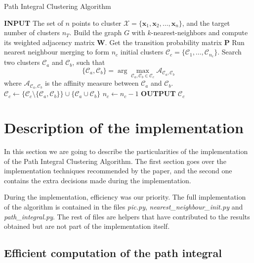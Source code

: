 \documentclass[
	10pt,
	parskip=half-,	
	paper=a4,
	english
	]{scrartcl}
\begin{document}
\begin{algorithm}
\caption{Path Integral Clustering Algorithm}
\begin{algorithmic}[1]
    \State \textbf{INPUT} The set of $n$ points to cluster $\mathcal{X} = \{\mathbf{x}_1, \mathbf{x}_2, \dots, \mathbf{x}_n\}$, and the target number of clusters $n_T$.
    \State Build the graph $G$ with $k$-nearest-neighbors and compute its weighted adjacency matrix $\mathbf{W}$.
    \State Get the transition probability matrix $\mathbf{P}$
    \State Run nearest neighbour merging to form $n_c$ initial clusters $\mathcal{C}_c = \{\mathcal{C}_1, \ldots, \mathcal{C}_{n_c}\}$.
        \State Search two clusters $\mathcal{C}_a$ and $\mathcal{C}_b$, such that 
        \[
        \{\mathcal{C}_a, \mathcal{C}_b\} = \arg\max_{\mathcal{C}_a, \mathcal{C}_b \in \mathcal{C}_c} \mathcal{A}_{\mathcal{C}_a, \mathcal{C}_b}
        \]
        where $\mathcal{A}_{\mathcal{C}_a, \mathcal{C}_b}$ is the affinity measure between $\mathcal{C}_a$ and $\mathcal{C}_b$.
        \State $\mathcal{C}_c \leftarrow \{\mathcal{C}_c \setminus \{\mathcal{C}_a, \mathcal{C}_b\} \} \cup \{\mathcal{C}_a \cup \mathcal{C}_b\}$
        \State $n_c \leftarrow n_c - 1$
    \EndWhile
    \State \textbf{OUTPUT} $\mathcal{C}_c$
\end{algorithmic}
\label{algorithmpseudo}
\end{algorithm}

\section {Description of the implementation}

In this section we are going to describe the particularities of the implementation of the Path Integral Clustering Algorithm. The first section goes over the implementation techniques recommended by the paper, and the second one contains the extra decisions made during the implementation. 

During the implementation, efficiency was our priority. The full implementation of the algorithm is contained in the files \textit{pic.py}, \textit{nearest\_neighbour\_init.py} and \textit{path\_integral.py}. The rest of files are helpers that have contributed to the results obtained but are not part of the implementation itself.

\subsection{Efficient computation of the path integral}
\end{document}
